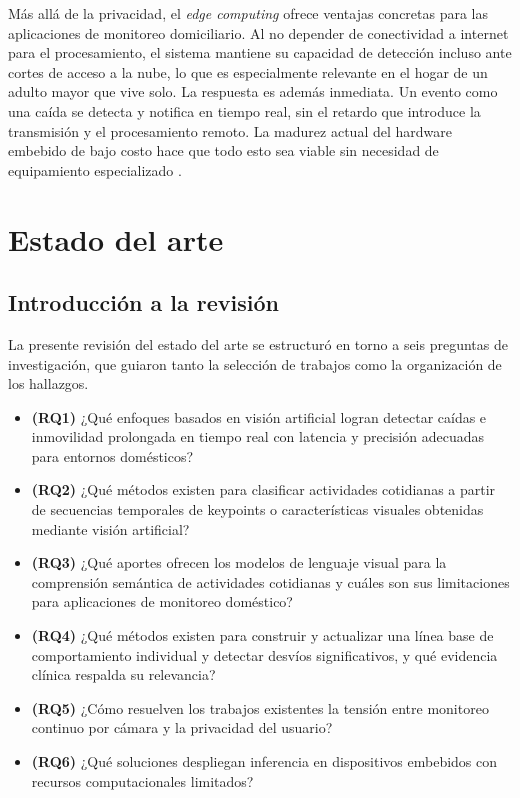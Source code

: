 Más allá de la privacidad, el \textit{edge computing} ofrece ventajas concretas para las aplicaciones de monitoreo domiciliario.
Al no depender de conectividad a internet para el procesamiento, el sistema mantiene su capacidad de detección incluso ante cortes de acceso a la nube, lo que es especialmente relevante en el hogar de un adulto mayor que vive solo.
La respuesta es además inmediata.
Un evento como una caída se detecta y notifica en tiempo real, sin el retardo que introduce la transmisión y el procesamiento remoto.
La madurez actual del hardware embebido de bajo costo hace que todo esto sea viable sin necesidad de equipamiento especializado \parencite{Surantha2025}.

\section{Estado del arte}

\subsection{Introducción a la revisión}
\label{sec:intro_revision}

La presente revisión del estado del arte se estructuró en torno a seis preguntas de investigación, que guiaron tanto la selección de trabajos como la organización de los hallazgos.

\begin{itemize}
    \item \textbf{(RQ1)} ¿Qué enfoques basados en visión artificial logran detectar caídas e inmovilidad prolongada en tiempo real con latencia y precisión adecuadas para entornos domésticos?
    \item \textbf{(RQ2)} ¿Qué métodos existen para clasificar actividades cotidianas a partir de secuencias temporales de keypoints o características visuales obtenidas mediante visión artificial?
    \item \textbf{(RQ3)} ¿Qué aportes ofrecen los modelos de lenguaje visual para la comprensión semántica de actividades cotidianas y cuáles son sus limitaciones para aplicaciones de monitoreo doméstico?
    \item \textbf{(RQ4)} ¿Qué métodos existen para construir y actualizar una línea base de comportamiento individual y detectar desvíos significativos, y qué evidencia clínica respalda su relevancia?
    \item \textbf{(RQ5)} ¿Cómo resuelven los trabajos existentes la tensión entre monitoreo continuo por cámara y la privacidad del usuario?
    \item \textbf{(RQ6)} ¿Qué soluciones despliegan inferencia en dispositivos embebidos con recursos computacionales limitados?
\end{itemize}

